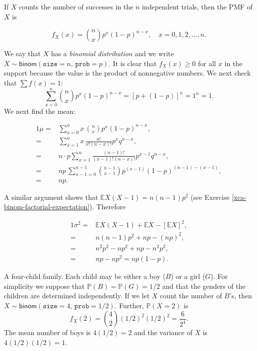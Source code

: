 \documentclass[]{book}
\numberwithin{equation}{chapter}
\numberwithin{figure}{chapter}
\theoremstyle{plain}
\theoremstyle{definition}
\theoremstyle{remark}
\theoremstyle{definition}
\theoremstyle{definition}
\theoremstyle{remark}
\let\BeginKnitrBlock\begin \let\EndKnitrBlock\end
\begin{document}
If \(X\) counts the number of successes in the \(n\) independent trials,
then the PMF of \(X\) is

\begin{equation}
f_{X}(x)={n \choose x}p^{x}(1-p)^{n-x},\quad x=0,1,2,\ldots,n.
\end{equation}

We say that \(X\) has a \emph{binomial distribution} and we write
\(X\sim\mathsf{binom}(\mathtt{size}=n,\,\mathtt{prob}=p)\). It is clear
that \(f_{X}(x)\geq0\) for all \(x\) in the support because the value is
the product of nonnegative numbers. We next check that \(\sum f(x)=1\):
\[ \sum_{x = 0}^{n}{n \choose x} p^{x} (1 - p)^{n - x} =
[p + (1 - p)]^{n} = 1^{n} = 1.  \] We next find the mean:

\begin{alignat*}{1}
\mu= & \sum_{x=0}^{n}x\,{n \choose x}p^{x}(1-p)^{n-x},\\
= & \sum_{x=1}^{n}x\,\frac{n!}{x!(n-x)!}p^{x}q^{n-x},\\
= & n\cdot p\sum_{x=1}^{n}\frac{(n-1)!}{(x-1)!(n-x)!}p^{x-1}q^{n-x},\\
= & np\,\sum_{x-1=0}^{n-1}{n-1 \choose x-1}p^{(x-1)}(1-p)^{(n-1)-(x-1)},\\
= & np.
\end{alignat*}

A similar argument shows that \(\mathbb{E} X(X - 1) = n(n - 1)p^{2}\)
(see Exercise \ref{xca-binom-factorial-expectation}). Therefore

\begin{alignat*}{1}
\sigma^{2}= & \mathbb{E} X(X-1)+\mathbb{E} X-[\mathbb{E} X]^{2},\\
= & n(n-1)p^{2}+np-(np)^{2},\\
= & n^{2}p^{2}-np^{2}+np-n^{2}p^{2},\\
= & np-np^{2}=np(1-p).
\end{alignat*}

\BeginKnitrBlock{example}
\protect\hypertarget{ex:unnamed-chunk-204}{}{\label{ex:unnamed-chunk-204}}A
four-child family. Each child may be either a boy (\(B\)) or a girl
(\(G\)). For simplicity we suppose that
\(\mathbb{P}(B)=\mathbb{P}(G)=1/2\) and that the genders of the children
are determined independently. If we let \(X\) count the number of
\(B\)'s, then
\(X\sim\mathsf{binom}(\mathtt{size}=4,\,\mathtt{prob}=1/2)\). Further,
\(\mathbb{P}(X=2)\) is \[
f_{X}(2)={4 \choose 2}(1/2)^{2}(1/2)^{2}=\frac{6}{2^{4}}.
\] The mean number of boys is \(4(1/2)=2\) and the variance of \(X\) is
\(4(1/2)(1/2)=1\).
\EndKnitrBlock{example}
\end{document}
